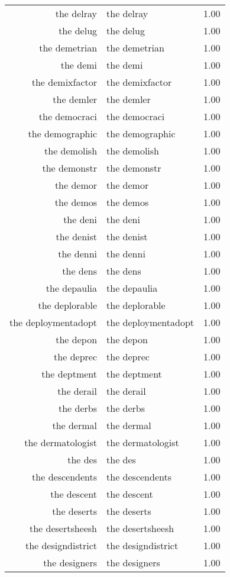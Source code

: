 \begin{table}[ht]
\begin{tabular}{rlr}
  the delray & the delray & 1.00 \\ 
  the delug & the delug & 1.00 \\ 
  the demetrian & the demetrian & 1.00 \\ 
  the demi & the demi & 1.00 \\ 
  the demixfactor & the demixfactor & 1.00 \\ 
  the demler & the demler & 1.00 \\ 
  the democraci & the democraci & 1.00 \\ 
  the demographic & the demographic & 1.00 \\ 
  the demolish & the demolish & 1.00 \\ 
  the demonstr & the demonstr & 1.00 \\ 
  the demor & the demor & 1.00 \\ 
  the demos & the demos & 1.00 \\ 
  the deni & the deni & 1.00 \\ 
  the denist & the denist & 1.00 \\ 
  the denni & the denni & 1.00 \\ 
  the dens & the dens & 1.00 \\ 
  the depaulia & the depaulia & 1.00 \\ 
  the deplorable & the deplorable & 1.00 \\ 
  the deploymentadopt & the deploymentadopt & 1.00 \\ 
  the depon & the depon & 1.00 \\ 
  the deprec & the deprec & 1.00 \\ 
  the deptment & the deptment & 1.00 \\ 
  the derail & the derail & 1.00 \\ 
  the derbs & the derbs & 1.00 \\ 
  the dermal & the dermal & 1.00 \\ 
  the dermatologist & the dermatologist & 1.00 \\ 
  the des & the des & 1.00 \\ 
  the descendents & the descendents & 1.00 \\ 
  the descent & the descent & 1.00 \\ 
  the deserts & the deserts & 1.00 \\ 
  the desertsheesh & the desertsheesh & 1.00 \\ 
  the designdistrict & the designdistrict & 1.00 \\ 
  the designers & the designers & 1.00 \\ 

\end{tabular}
\end{table}
